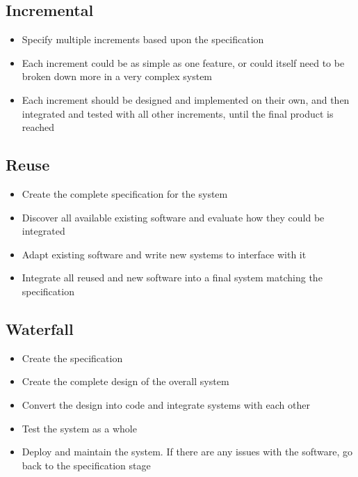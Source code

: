 \subsection*{Incremental}

\begin{itemize}
  \item Specify multiple increments based upon the specification
  \item Each increment could be as simple as one feature, or could itself need to be broken down more in a very complex system
  \item Each increment should be designed and implemented on their own, and then integrated and tested with all other increments, until the final product is reached
\end{itemize}

\subsection*{Reuse}

\begin{itemize}
  \item Create the complete specification for the system
  \item Discover all available existing software and evaluate how they could be integrated
  \item Adapt existing software and write new systems to interface with it
  \item Integrate all reused and new software into a final system matching the specification
\end{itemize}

\subsection*{Waterfall}

\begin{itemize}
  \item Create the specification
  \item Create the complete design of the overall system
  \item Convert the design into code and integrate systems with each other
  \item Test the system as a whole
  \item Deploy and maintain the system. If there are any issues with the software, go back to the specification stage
\end{itemize}